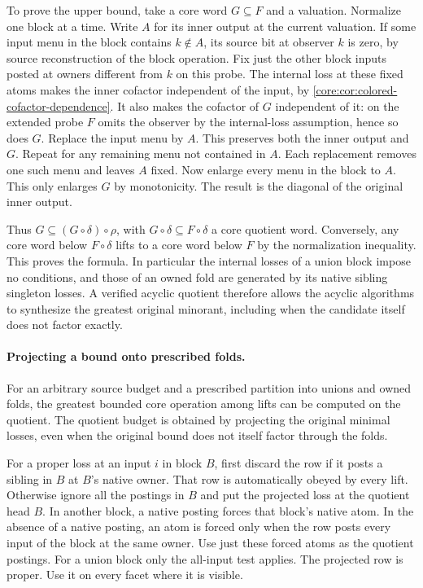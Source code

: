 To prove the upper bound, take a core word $G\subseteq F$
and a valuation. Normalize one block at a time.
Write $A$ for its inner output at the current valuation.
If some input menu in the block contains $k\notin A$,
its source bit at observer $k$ is zero, by source
reconstruction of the block operation. Fix just the
other block inputs posted at owners different from
$k$ on this probe. The internal loss at these fixed
atoms makes the inner cofactor independent of the
input, by \cref{core:cor:colored-cofactor-dependence}.
It also makes the cofactor of $G$ independent of it:
on the extended probe $F$ omits the observer by the
internal-loss assumption, hence so does $G$.
Replace the input menu by $A$. This preserves both
the inner output and $G$. Repeat for any remaining
menu not contained in $A$. Each replacement removes
one such menu and leaves $A$ fixed. Now enlarge every
menu in the block to $A$. This only enlarges $G$ by
monotonicity. The result is the diagonal of the
original inner output.

Thus $G\subseteq (G\circ\delta)\circ\rho$,
with $G\circ\delta\subseteq F\circ\delta$ a core
quotient word. Conversely, any core word below
$F\circ\delta$ lifts to a core word below $F$
by the normalization inequality. This proves the
formula. In particular the internal losses of a
union block impose no conditions, and those of an
owned fold are generated by its native sibling
singleton losses. A verified acyclic quotient therefore
allows the acyclic algorithms to synthesize the
greatest original minorant, including when the
candidate itself does not factor exactly.

\paragraph{Projecting a bound onto prescribed folds.}
For an arbitrary source budget and a prescribed partition
into unions and owned folds, the greatest bounded core
operation among lifts can be computed on the quotient.
The quotient budget is obtained by projecting the
original minimal losses, even when the original bound
does not itself factor through the folds.

For a proper loss at an input $i$ in block $B$,
first discard the row if it posts a sibling in $B$
at $B$'s native owner. That row is automatically
obeyed by every lift. Otherwise ignore all the
postings in $B$ and put the projected loss at
the quotient head $B$. In another block, a native
posting forces that block's native atom. In the
absence of a native posting, an atom is forced
only when the row posts every input of the block
at the same owner. Use just these forced atoms as
the quotient postings. For a union block only the
all-input test applies. The projected row is proper.
Use it on every facet where it is visible.

